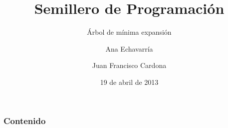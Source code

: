 \documentclass{beamer}
\title{Semillero de Programación}
\subtitle{Árbol de mínima expansión}
\author{Ana Echavarría \and Juan Francisco Cardona}
\institute{Universidad EAFIT}
\date{19 de abril de 2013}
\begin{document}
\begin{frame}
	\titlepage
\end{frame}

\begin{frame}
	\frametitle{Contenido}
	\tableofcontents
\end{frame}

% 	
% 	
% 
% 
% 
% 
% 
% 
% 
\end{document}
